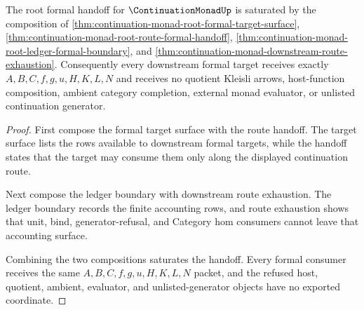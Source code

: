 \begin{theorem}
\label{thm:continuation-monad-root-formal-handoff-saturation}
The root formal handoff for $\ContinuationMonadUp$ is saturated by the composition of \autoref{thm:continuation-monad-root-formal-target-surface}, \autoref{thm:continuation-monad-root-route-formal-handoff}, \autoref{thm:continuation-monad-root-ledger-formal-boundary}, and \autoref{thm:continuation-monad-downstream-route-exhaustion}. Consequently every downstream formal target receives exactly $A,B,C,f,g,u,H,K,L,N$ and receives no quotient Kleisli arrows, host-function composition, ambient category completion, external monad evaluator, or unlisted continuation generator.
\end{theorem}
\begin{proof}
First compose the formal target surface with the route handoff. The target surface lists the rows available to downstream formal targets, while the handoff states that the target may consume them only along the displayed continuation route.

Next compose the ledger boundary with downstream route exhaustion. The ledger boundary records the finite accounting rows, and route exhaustion shows that unit, bind, generator-refusal, and Category hom consumers cannot leave that accounting surface.

Combining the two compositions saturates the handoff. Every formal consumer receives the same $A,B,C,f,g,u,H,K,L,N$ packet, and the refused host, quotient, ambient, evaluator, and unlisted-generator objects have no exported coordinate.
\end{proof}

